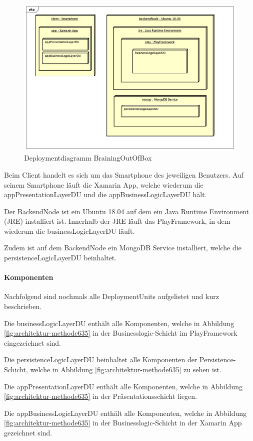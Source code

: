 \begin{figure}[h]
	\centering
	\includegraphics[width=1\linewidth]{img/deployment/DD_Methode635}
	\caption{Deploymentdiagramm BrainingOutOfBox}
	\label{fig:deployment-methode635}
\end{figure}

Beim Client handelt es sich um das Smartphone des jeweiligen Benutzers. Auf seinem Smartphone läuft die Xamarin App, welche wiederum die appPresentationLayerDU und die appBusinessLogicLayerDU hält.

Der BackendNode ist ein Ubuntu 18.04 auf dem ein Java Runtime Environment (JRE) installiert ist. Innerhalb der JRE läuft das PlayFramework, in dem wiederum die businessLogicLayerDU läuft.

Zudem ist auf dem BackendNode ein MongoDB Service installiert, welche  die persistenceLogicLayerDU beinhaltet.

\paragraph*{Komponenten}
Nachfolgend sind nochmals alle DeploymentUnits aufgelistet und kurz beschrieben.
\begin{description}[leftmargin=!,labelwidth=\widthof{\bfseries appBusinessLogicLayerDU}]
	\item[businessLogicLayerDU] Die businessLogicLayerDU enthält alle Komponenten, welche in Abbildung \ref{fig:architektur-methode635} in der Businesslogic-Schicht im PlayFramework eingezeichnet sind.
	\item[persistenceLogicLayerDU] Die persistenceLogicLayerDU beinhaltet alle Komponenten der Persistence-Schicht, welche in Abbildung \ref{fig:architektur-methode635} zu sehen ist.
	\item[appPresentationLayerDU] Die appPresentationLayerDU enthält alle Komponenten, welche in Abbildung \ref{fig:architektur-methode635} in der Präsentationsschicht liegen.
	\item[appBusinessLogicLayerDU] Die appBusinessLogicLayerDU enthält alle Komponenten, welche in Abbildung \ref{fig:architektur-methode635} in der Businesslogic-Schicht in der Xamarin App gezeichnet sind.
\end{description}
